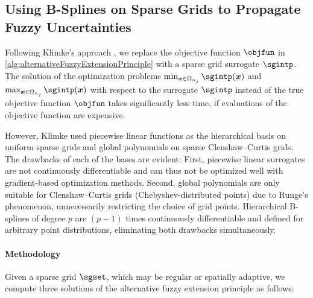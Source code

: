 \subsection{Using B-Splines on Sparse Grids to Propagate Fuzzy Uncertainties}
\label{sec:553fuzzyBSplines}

Following Klimke's approach \cite{Klimke06Uncertainty},
we replace the objective function $\objfun$ in
\cref{alg:alternativeFuzzyExtensionPrinciple}
with a sparse grid surrogate $\sgintp$.
The solution of the optimization problems
$\min_{\*x \in \Omega_{\alpha_j}} \sgintp(\*x)$ and
$\max_{\*x \in \Omega_{\alpha_j}} \sgintp(\*x)$ with respect to the
surrogate $\sgintp$ instead of the true objective function $\objfun$
takes significantly less time, if evaluations of the objective function
are expensive.

However, Klimke used piecewise linear functions as the hierarchical basis on
uniform sparse grids and global polynomials on sparse Clenshaw--Curtis grids.
The drawbacks of each of the bases are evident:
First, piecewise linear surrogates are not continuously differentiable and
can thus not be optimized well with gradient-based optimization methods.
Second, global polynomials are only suitable for
Clenshaw--Curtis grids (Chebyshev-distributed points)
due to Runge's phenomenon,
unnecessarily restricting the choice of grid points.
Hierarchical B-splines of degree $p$ are $(p - 1)$ times
continuously differentiable and defined for arbitrary point
distributions, eliminating both drawbacks simultaneously.

\paragraph{Methodology}

Given a sparse grid $\sgset$, which may be regular or spatially adaptive,
we compute three solutions of the alternative fuzzy extension principle
as follows:

